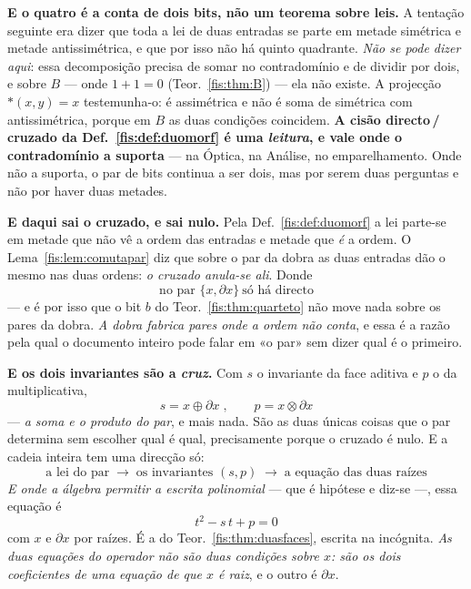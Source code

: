 \documentclass[livro.tex]{subfiles}
\begin{document}
\medskip\noindent\textbf{E o quatro é a conta de dois bits, não um teorema sobre
leis.} A tentação seguinte era dizer que toda a lei de duas entradas se parte em
metade simétrica e metade antissimétrica, e que por isso não há quinto quadrante.
\emph{Não se pode dizer aqui}: essa decomposição precisa de somar no
contradomínio e de dividir por dois, e sobre $B$ --- onde $1+1=0$
(Teor.~\ref{fis:thm:B}) --- ela não existe. A projecção $\ast(x,y)=x$ testemunha-o:
é assimétrica e não é soma de simétrica com antissimétrica, porque em $B$ as duas
condições coincidem. \textbf{A cisão directo\,/\,cruzado da
Def.~\ref{fis:def:duomorf} é uma \emph{leitura}, e vale onde o contradomínio a
suporta} --- na Óptica, na Análise, no emparelhamento. Onde não a suporta, o par
de bits continua a ser dois, mas por serem duas perguntas e não por haver duas
metades.

\medskip\noindent\textbf{E daqui sai o cruzado, e sai nulo.} Pela
Def.~\ref{fis:def:duomorf} a lei parte-se em metade que não vê a ordem das
entradas e metade que \emph{é} a ordem. O Lema~\ref{fis:lem:comutapar} diz que
sobre o par da dobra as duas entradas dão o mesmo nas duas ordens: \emph{o
cruzado anula-se ali}. Donde
\[
\boxed{\;\text{no par }\{x,\partial x\}\ \text{só há directo}\;}
\]
--- e é por isso que o bit $b$ do Teor.~\ref{fis:thm:quarteto} não move nada
sobre os pares da dobra. \emph{A dobra fabrica pares onde a ordem não conta}, e
essa é a razão pela qual o documento inteiro pode falar em «o par» sem dizer qual
é o primeiro.

\medskip\noindent\textbf{E os dois invariantes são a \emph{cruz}.} Com $s$ o
invariante da face aditiva e $p$ o da multiplicativa,
\[
\boxed{\;s=x\oplus\partial x\;,\qquad p=x\otimes\partial x\;}
\]
--- \emph{a soma e o produto do par}, e mais nada. São as duas únicas coisas que
o par determina sem escolher qual é qual, precisamente porque o cruzado é nulo.
E a cadeia inteira tem uma direcção só:
\[
\boxed{\;\text{a lei do par}\;\longrightarrow\;\text{os invariantes }(s,p)\;\longrightarrow\;\text{a equação das duas raízes}\;}
\]
\emph{E onde a álgebra permitir a escrita polinomial} --- que é hipótese e
diz-se ---, essa equação é
\[
\boxed{\;t^{2}-s\,t+p=0\;}
\]
com $x$ e $\partial x$ por raízes. É a do Teor.~\ref{fis:thm:duasfaces}, escrita
na incógnita. \emph{As duas equações do operador não são duas condições sobre
$x$: são os dois coeficientes de uma equação de que $x$ é raiz}, e o outro é
$\partial x$.
\end{document}
